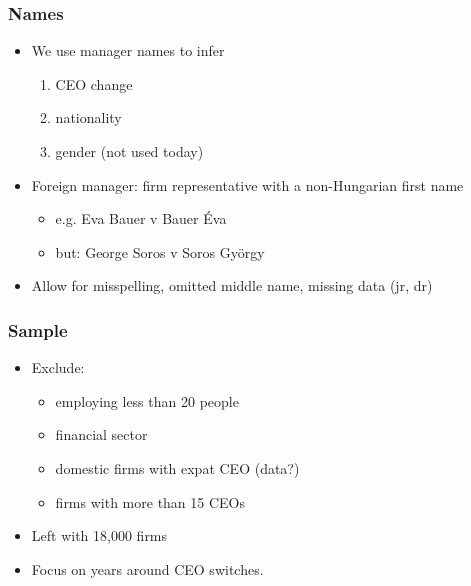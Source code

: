 \documentclass[aspectratio=43,compress,mathserif]{beamer}
\begin{document}
\begin{frame}\frametitle{Names}\hypertarget{Names}{}
\begin{itemize}
\item We use manager names to infer 
\begin{enumerate}\setcounter{enumi}{0}
\item CEO change

\item nationality

\item gender (not used today)
\end{enumerate}

\item Foreign manager: firm representative with a non-Hungarian first name
\begin{itemize}
\item e.g. Eva Bauer v Bauer Éva

\item but: George Soros v Soros György
\end{itemize}

\item Allow for misspelling, omitted middle name, missing data (jr, dr)


\end{itemize}
\end{frame}



\begin{frame}\frametitle{Sample}\hypertarget{Sample}{}
\begin{itemize}
\item Exclude: 
\begin{itemize}
\item employing less than 20 people

\item financial sector

\item domestic firms with expat CEO (data?)

\item firms with more than 15 CEOs
\end{itemize}

\item Left with 18,000 firms

\item Focus on years around CEO switches.


\end{itemize}
\end{frame}
\end{document}
